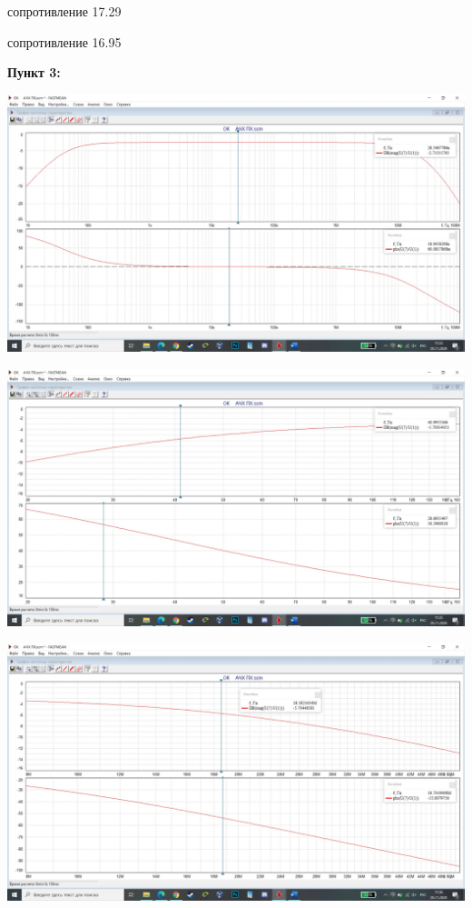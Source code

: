 \documentclass[a4paper,14pt]{extarticle}
\begin{document}
    сопротивление 17.29

    сопротивление 16.95

    \newpage 
    \textbf{Пункт 3:}
    \begin{center}
        \includegraphics[scale=0.25]{3.1.jpg}
    \end{center}
    \begin{center}
        \includegraphics[scale=0.25]{3.2.jpg}
    \end{center}
    \begin{center}
        \includegraphics[scale=0.25]{3.3.jpg}
    \end{center}
\end{document}
